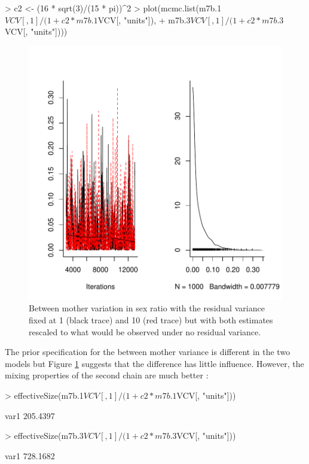 \documentclass{article}
\begin{document}
\begin{Schunk}
\begin{Sinput}
> c2 <- (16 * sqrt(3)/(15 * pi))^2
> plot(mcmc.list(m7b.1$VCV[, 1]/(1 + c2 * m7b.1$VCV[, "units"]), 
+     m7b.3$VCV[, 1]/(1 + c2 * m7b.3$VCV[, "units"])))
\end{Sinput}
\end{Schunk}

\begin{figure}[!h]
\begin{center}
\includegraphics{Lecture8-022}
\end{center}
\caption{Between mother variation in sex ratio with the residual variance fixed at 1 (black trace) and 10 (red trace) but with both estimates rescaled to what would be observed under no residual variance.}
\label{sexratio2}
\end{figure}


The prior specification for the between mother variance is different in the two models but Figure \ref{sexratio2} suggests that the difference has little influence. However, the mixing properties of the second chain are much better \citep{vanDyk.2001}:

\begin{Schunk}
\begin{Sinput}
> effectiveSize(m7b.1$VCV[, 1]/(1 + c2 * m7b.1$VCV[, "units"]))
\end{Sinput}
\begin{Soutput}
    var1 
205.4397 
\end{Soutput}
\begin{Sinput}
> effectiveSize(m7b.3$VCV[, 1]/(1 + c2 * m7b.3$VCV[, "units"]))
\end{Sinput}
\begin{Soutput}
    var1 
728.1682 
\end{Soutput}
\end{Schunk}
\end{document}
